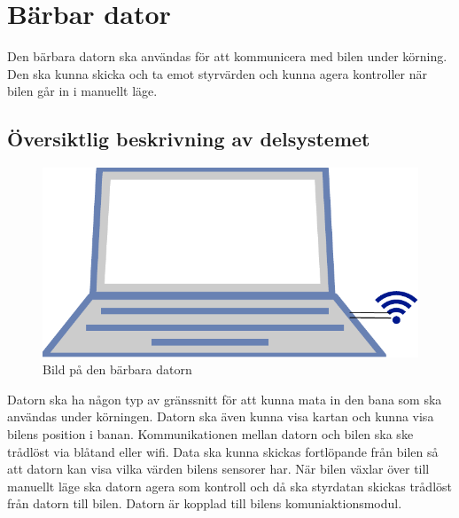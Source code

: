 \documentclass[systemskiss/skiss.tex]{subfiles}
\begin{document}
\section{Bärbar dator}
Den bärbara datorn ska användas för att kommunicera med bilen under körning. Den ska kunna skicka och ta emot styrvärden och kunna agera kontroller när bilen går in i manuellt läge.
\subsection{Översiktlig beskrivning av delsystemet}
\begin{figure}[h]
    \centering
    \includegraphics[width=0.6\linewidth]{systemskiss/figures/laptop.pdf}
    \caption{Bild på den bärbara datorn}
    \label{fig:laptopskiss}
\end{figure}
Datorn ska ha någon typ av gränssnitt för att kunna mata in den bana som ska användas under körningen. Datorn ska även kunna visa kartan och kunna visa bilens position i banan. Kommunikationen mellan datorn och bilen ska ske trådlöst via blåtand eller wifi. Data ska kunna skickas fortlöpande från bilen så att datorn kan visa vilka värden bilens sensorer har. När bilen växlar över till manuellt läge ska datorn agera som kontroll och då ska styrdatan skickas trådlöst från datorn till bilen. Datorn är kopplad till bilens komuniaktionsmodul.
\end{document}
